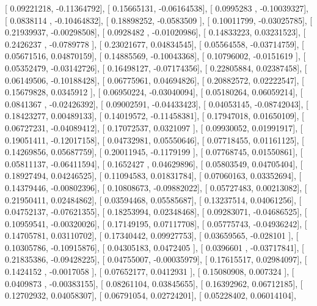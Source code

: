 \documentclass{article}
\begin{document}
       [ 0.09221218, -0.11364792],
       [ 0.15665131, -0.06164538],
       [ 0.0995283 , -0.10039327],
       [ 0.0838114 , -0.10464832],
       [ 0.18898252, -0.0583509 ],
       [ 0.10011799, -0.03025785],
       [ 0.21939937, -0.00298508],
       [ 0.0928482 , -0.01020986],
       [ 0.14833223,  0.03231523],
       [ 0.2426237 , -0.0789778 ],
       [ 0.23021677,  0.04834545],
       [ 0.05564558, -0.03714759],
       [ 0.05671516,  0.04870159],
       [ 0.14885569, -0.10043368],
       [ 0.10796002, -0.0151619 ],
       [ 0.05352479, -0.03142726],
       [ 0.16498127, -0.07174356],
       [ 0.22805884,  0.02387458],
       [ 0.06149506, -0.10188428],
       [ 0.06775961,  0.04694826],
       [ 0.20882572,  0.02222547],
       [ 0.15679828,  0.0345912 ],
       [ 0.06950224, -0.03040094],
       [ 0.05180264,  0.06059214],
       [ 0.0841367 , -0.02426392],
       [ 0.09002591, -0.04433423],
       [ 0.04053145, -0.08742043],
       [ 0.18423277,  0.00489133],
       [ 0.14019572, -0.11458381],
       [ 0.17947018,  0.01650109],
       [ 0.06727231, -0.04089412],
       [ 0.17072537,  0.0321097 ],
       [ 0.09930052,  0.01991917],
       [ 0.19051411, -0.12017158],
       [ 0.04732981,  0.05550646],
       [ 0.07718455,  0.01161125],
       [ 0.14269856,  0.05687759],
       [ 0.20011945, -0.1179199 ],
       [ 0.07768745,  0.01550861],
       [ 0.05811137, -0.06411594],
       [ 0.1652427 ,  0.04629896],
       [ 0.05803549,  0.04705404],
       [ 0.18927494,  0.04246525],
       [ 0.11094583,  0.01831784],
       [ 0.07060163,  0.03352694],
       [ 0.14379446, -0.00802396],
       [ 0.10808673, -0.09882022],
       [ 0.05727483,  0.00213082],
       [ 0.21950411,  0.02484862],
       [ 0.03594468,  0.05585687],
       [ 0.13237514,  0.04061256],
       [ 0.04752137, -0.07621355],
       [ 0.18253994,  0.02348468],
       [ 0.09283071, -0.04686525],
       [ 0.10959541, -0.00320026],
       [ 0.17149195,  0.07117708],
       [ 0.05775743, -0.04936242],
       [ 0.14705781,  0.03110702],
       [ 0.17340442,  0.09927753],
       [ 0.03659565, -0.028101  ],
       [ 0.10305786, -0.10915876],
       [ 0.04305183,  0.0472405 ],
       [ 0.0396601 , -0.03717841],
       [ 0.21835386, -0.09428225],
       [ 0.04755007, -0.00035979],
       [ 0.17615517,  0.02984097],
       [ 0.1424152 , -0.0017058 ],
       [ 0.07652177,  0.0412931 ],
       [ 0.15080908,  0.007324  ],
       [ 0.0409873 , -0.00383155],
       [ 0.08261104,  0.03845655],
       [ 0.16392962,  0.06712185],
       [ 0.12702932,  0.04058307],
       [ 0.06791054,  0.02724201],
       [ 0.05228402,  0.06014104],
\end{document}
